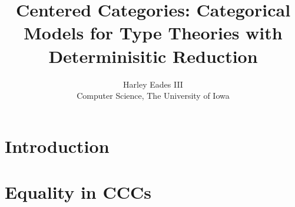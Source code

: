\documentclass{article}
\begin{document}
\title{Centered Categories: Categorical Models for Type Theories with Determinisitic Reduction}

\author{Harley Eades III \\
Computer Science, The University of Iowa}

\date{}

\maketitle

\newcommand{\imp}[1]{\stackrel{#1}{\to}}
\newcommand{\orbox}[2]{#1 \vee #2}

\section{Introduction}
\label{sec:introduction}


\section{Equality in CCCs}
\label{sec:equality_in_cccs}
\end{document}
